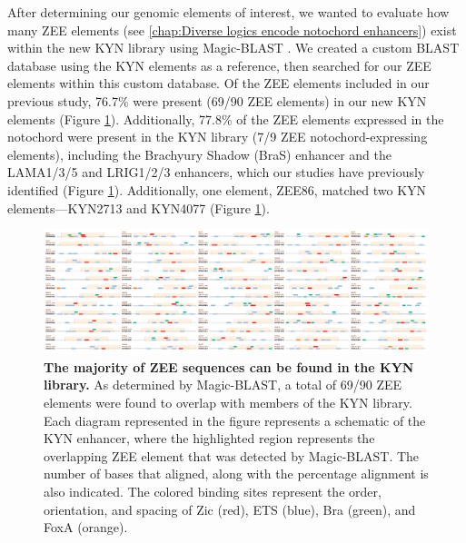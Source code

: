 After determining our genomic elements of interest, we wanted to evaluate how many ZEE elements (see \ref{chap:Diverse logics encode notochord enhancers}) exist within the new KYN library using Magic-BLAST \cite{boratyn2019}. We created a custom BLAST database using the KYN elements as a reference, then searched for our ZEE elements within this custom database. Of the ZEE elements included in our previous study, 76.7\% were present (69/90 ZEE elements) in our new KYN elements (Figure \ref{fig:1 zee comparison}). Additionally, 77.8\% of the ZEE elements expressed in the notochord were present in the KYN library (7/9 ZEE notochord-expressing elements), including the Brachyury Shadow (BraS) enhancer and the LAMA1/3/5 and LRIG1/2/3 enhancers, which our studies have previously identified (Figure \ref{fig:1 zee comparison}). Additionally, one element, ZEE86, matched two KYN elements—KYN2713 and KYN4077 (Figure \ref{fig:1 zee comparison}). 

\begin{landscape}
    \begin{figure}[h]
        \centering
        \includegraphics[scale=0.12]{3_figures-and-files/Fig1_ZEE-Comparison.png}
        \caption[The majority of ZEE sequences can be found in the KYN library]{\textbf{The majority of ZEE sequences can be found in the KYN library.} 
        As determined by Magic-BLAST, a total of 69/90 ZEE elements were found to overlap with members of the KYN library. Each diagram represented in the figure represents a schematic of the KYN enhancer, where the highlighted region represents the overlapping ZEE element that was detected by Magic-BLAST. The number of bases that aligned, along with the percentage alignment is also indicated. The colored binding sites represent the order, orientation, and spacing of Zic (red), ETS (blue), Bra (green), and FoxA (orange).}
        \label{fig:1 zee comparison}
    \end{figure}
\end{landscape}

